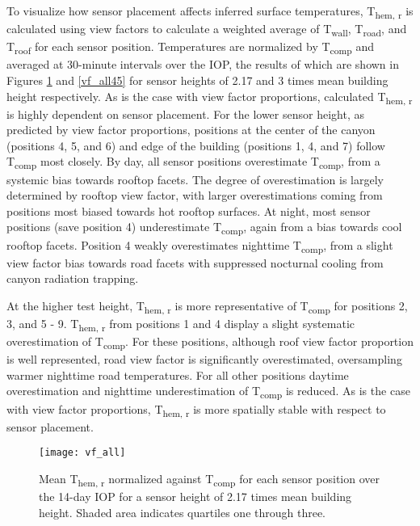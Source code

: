 \begin{bibunit}
To visualize how sensor placement affects inferred surface temperatures, T\textsubscript{hem, r} is calculated using view factors to calculate a weighted average of T\textsubscript{wall}, T\textsubscript{road}, and T\textsubscript{roof} for each sensor position. Temperatures are normalized by T\textsubscript{comp} and averaged at 30-minute intervals over the IOP, the results of which are shown in Figures \ref{vf_all} and \ref{vf_all45} for sensor heights of 2.17 and 3 times mean building height respectively. As is the case with view factor proportions, calculated T\textsubscript{hem, r} is highly dependent on sensor placement. For the lower sensor height, as predicted by view factor proportions, positions at the center of the canyon (positions 4, 5, and 6) and edge of the building (positions 1, 4, and 7) follow T\textsubscript{comp} most closely. By day, all sensor positions overestimate T\textsubscript{comp}, from a systemic bias towards rooftop facets. The degree of overestimation is largely determined by rooftop view factor, with larger overestimations coming from positions most biased towards hot rooftop surfaces. At night, most sensor positions (save position 4) underestimate T\textsubscript{comp}, again from a bias towards cool rooftop facets. Position 4 weakly overestimates nighttime T\textsubscript{comp}, from a slight view factor bias towards road facets with suppressed nocturnal cooling from canyon radiation trapping. 

At the higher test height, T\textsubscript{hem, r} is more representative of T\textsubscript{comp} for positions 2, 3, and 5 - 9. T\textsubscript{hem, r} from positions 1 and 4 display a slight systematic overestimation of T\textsubscript{comp}. For these positions, although roof view factor proportion is well represented, road view factor is significantly overestimated, oversampling warmer nighttime road temperatures. For all other positions daytime overestimation and nighttime underestimation of T\textsubscript{comp} is reduced. As is the case with view factor proportions, T\textsubscript{hem, r} is more spatially stable with respect to sensor placement.
 
   \begin{figure}[H]
 	\centering
 	\texttt{[image: vf\_all]}
 	\caption{Mean T\textsubscript{hem, r} normalized against T\textsubscript{comp} for each sensor position over the 14-day IOP for a sensor height of 2.17 times mean building height. Shaded area indicates quartiles one through three.}
 	\label{vf_all}
 \end{figure}


\end{bibunit}
